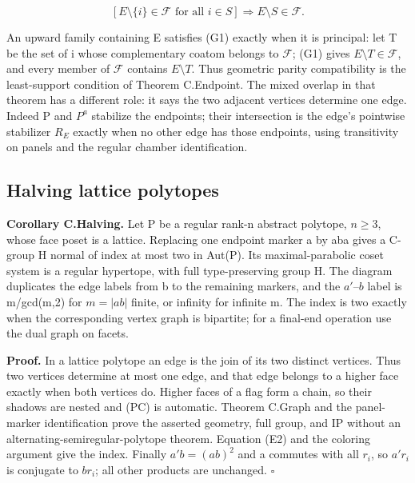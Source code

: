 \[
[E\setminus\{i\}\in\mathcal F\text{ for all }i\in S]
\Longrightarrow E\setminus S\in\mathcal F.
\tag{G1}
\]

An upward family containing E satisfies (G1) exactly when it is
principal: let T be the set of i whose complementary coatom belongs to
\(\mathcal F\); (G1) gives \(E\setminus T\in \mathcal F\), and every
member of \(\mathcal F\) contains \(E\setminus T\). Thus geometric parity
compatibility is the least-support condition of Theorem C.Endpoint. The
mixed overlap in that theorem has a different role: it says the two
adjacent vertices determine one edge. Indeed P and \(P^a\) stabilize the
endpoints; their intersection is the edge's pointwise stabilizer \(R_E\)
exactly when no other edge has those endpoints, using transitivity on
panels and the regular chamber identification.

\subsection{Halving lattice polytopes}\label{halving-lattice-polytopes}

\textbf{Corollary C.Halving.} Let P be a regular rank-n abstract
polytope, \(n\ge 3\), whose face poset is a lattice. Replacing one
endpoint marker a by aba gives a C-group H normal of index at most two
in Aut(P). Its maximal-parabolic coset system is a regular hypertope,
with full type-preserving group H. The diagram duplicates the edge
labels from b to the remaining markers, and the \(a'–b\) label is
m/gcd(m,2) for \(m=|ab|\) finite, or infinity for infinite m. The index
is two exactly when the corresponding vertex graph is bipartite; for a
final-end operation use the dual graph on facets.

\textbf{Proof.} In a lattice polytope an edge is the join of its two
distinct vertices. Thus two vertices determine at most one edge, and
that edge belongs to a higher face exactly when both vertices do. Higher
faces of a flag form a chain, so their shadows are nested and (PC) is
automatic. Theorem C.Graph and the panel-marker identification prove the
asserted geometry, full group, and IP without an
alternating-semiregular-polytope theorem. Equation (E2) and the coloring
argument give the index. Finally \(a'b=(ab)^{2}\) and a commutes with
all \(r_i\), so \(a'r_i\) is conjugate to \(br_i\); all other products
are unchanged. \(\square\)


